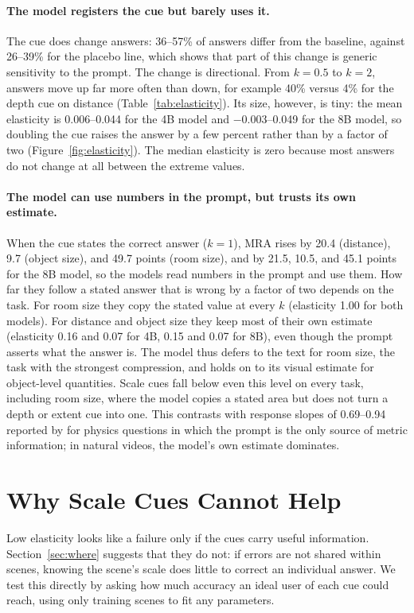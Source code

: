 \documentclass[letterpaper]{article} %
\begin{document}
\paragraph{The model registers the cue but barely uses it.}
The cue does change answers: 36--57\% of answers differ from the baseline, against 26--39\% for the placebo line, which shows that part of this change is generic sensitivity to the prompt. The change is directional. From $k=0.5$ to $k=2$, answers move up far more often than down, for example 40\% versus 4\% for the depth cue on distance (Table~\ref{tab:elasticity}). Its size, however, is tiny: the mean elasticity is 0.006--0.044 for the 4B model and $-0.003$--0.049 for the 8B model, so doubling the cue raises the answer by a few percent rather than by a factor of two (Figure~\ref{fig:elasticity}). The median elasticity is zero because most answers do not change at all between the extreme values.

\paragraph{The model can use numbers in the prompt, but trusts its own estimate.}
When the cue states the correct answer ($k=1$), MRA rises by 20.4 (distance), 9.7 (object size), and 49.7 points (room size), and by 21.5, 10.5, and 45.1 points for the 8B model, so the models read numbers in the prompt and use them. How far they follow a stated answer that is wrong by a factor of two depends on the task. For room size they copy the stated value at every $k$ (elasticity 1.00 for both models). For distance and object size they keep most of their own estimate (elasticity 0.16 and 0.07 for 4B, 0.15 and 0.07 for 8B), even though the prompt asserts what the answer is. The model thus defers to the text for room size, the task with the strongest compression, and holds on to its visual estimate for object-level quantities. Scale cues fall below even this level on every task, including room size, where the model copies a stated area but does not turn a depth or extent cue into one. This contrasts with response slopes of 0.69--0.94 reported by \citet{tan2026scale} for physics questions in which the prompt is the only source of metric information; in natural videos, the model's own estimate dominates.

\section{Why Scale Cues Cannot Help}
Low elasticity looks like a failure only if the cues carry useful information. Section~\ref{sec:where} suggests that they do not: if errors are not shared within scenes, knowing the scene's scale does little to correct an individual answer. We test this directly by asking how much accuracy an ideal user of each cue could reach, using only training scenes to fit any parameters.
\end{document}
